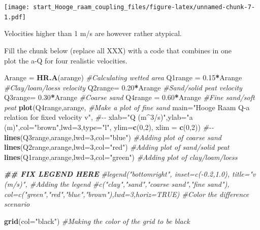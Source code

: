 \documentclass[
]{article}
\newenvironment{Shaded}{\begin{snugshade}}{\end{snugshade}}
\newcommand{\AttributeTok}[1]{\textcolor[rgb]{0.13,0.29,0.53}{#1}}
\newcommand{\CommentTok}[1]{\textcolor[rgb]{0.56,0.35,0.01}{\textit{#1}}}
\newcommand{\DecValTok}[1]{\textcolor[rgb]{0.00,0.00,0.81}{#1}}
\newcommand{\DocumentationTok}[1]{\textcolor[rgb]{0.56,0.35,0.01}{\textbf{\textit{#1}}}}
\newcommand{\FloatTok}[1]{\textcolor[rgb]{0.00,0.00,0.81}{#1}}
\newcommand{\FunctionTok}[1]{\textcolor[rgb]{0.13,0.29,0.53}{\textbf{#1}}}
\newcommand{\NormalTok}[1]{#1}
\newcommand{\OtherTok}[1]{\textcolor[rgb]{0.56,0.35,0.01}{#1}}
\newcommand{\SpecialCharTok}[1]{\textcolor[rgb]{0.81,0.36,0.00}{\textbf{#1}}}
\newcommand{\StringTok}[1]{\textcolor[rgb]{0.31,0.60,0.02}{#1}}
\begin{document}
\texttt{[image: start\_Hooge\_raam\_coupling\_files/figure-latex/unnamed-chunk-7-1.pdf]}

Velocities higher than 1 m/s are however rather atypical.

Fill the chunk below (replace all XXX) with a code that combines in
one\\
plot the a-Q for four realistic velocities.

\begin{Shaded}
\begin{Highlighting}[]
\NormalTok{Arange }\OtherTok{=}  \FunctionTok{HR.A}\NormalTok{(arange) }\CommentTok{\#Calculating wetted area}
\NormalTok{Q1range }\OtherTok{=} \FloatTok{0.15}\SpecialCharTok{*}\NormalTok{Arange  }\CommentTok{\#Clay/loam/loess velocity}
\NormalTok{Q2range}\OtherTok{=}  \FloatTok{0.20}\SpecialCharTok{*}\NormalTok{Arange   }\CommentTok{\#Sand/solid peat velocity}
\NormalTok{Q3range}\OtherTok{=}  \FloatTok{0.30}\SpecialCharTok{*}\NormalTok{Arange  }\CommentTok{\#Coarse sand }
\NormalTok{Q4range }\OtherTok{=} \FloatTok{0.60}\SpecialCharTok{*}\NormalTok{Arange     }\CommentTok{\#Fine sand/soft peat}
\FunctionTok{plot}\NormalTok{(Q4range,arange,   }\CommentTok{\#Make a plot of fine sand}
     \AttributeTok{main=}\StringTok{"Hooge Raam Q{-}a relation for fixed velocity v"}\NormalTok{, }\CommentTok{\#{-}{-}}
     \AttributeTok{xlab=}\StringTok{"Q (m\^{}3/s)"}\NormalTok{,}\AttributeTok{ylab=}\StringTok{"a (m)"}\NormalTok{,}\AttributeTok{col=}\StringTok{"brown"}\NormalTok{,}\AttributeTok{lwd=}\DecValTok{3}\NormalTok{,}\AttributeTok{type=}\StringTok{"l"}\NormalTok{, }\AttributeTok{ylim=}\FunctionTok{c}\NormalTok{(}\DecValTok{0}\NormalTok{,}\DecValTok{2}\NormalTok{), }\AttributeTok{xlim =} \FunctionTok{c}\NormalTok{(}\DecValTok{0}\NormalTok{,}\DecValTok{2}\NormalTok{)) }\CommentTok{\#{-}{-}}
\FunctionTok{lines}\NormalTok{(Q3range,arange,}\AttributeTok{lwd=}\DecValTok{3}\NormalTok{,}\AttributeTok{col=}\StringTok{"blue"}\NormalTok{) }\CommentTok{\#Adding plot of coarse sand}
\FunctionTok{lines}\NormalTok{(Q2range,arange,}\AttributeTok{lwd=}\DecValTok{3}\NormalTok{,}\AttributeTok{col=}\StringTok{"red"}\NormalTok{)  }\CommentTok{\#Adding plot of sand/solid peat}
\FunctionTok{lines}\NormalTok{(Q1range,arange,}\AttributeTok{lwd=}\DecValTok{3}\NormalTok{,}\AttributeTok{col=}\StringTok{"green"}\NormalTok{) }\CommentTok{\#Adding plot of clay/loam/loess}

\DocumentationTok{\#\# FIX LEGEND HERE}
\CommentTok{\#legend("bottomright", inset=c({-}0.2,1.0), title="v (m/s)", \#Adding the legend}
\CommentTok{\#c("clay","sand","coarse sand","fine sand"), col=c("green","red","blue","brown"),lwd=3,horiz=TRUE) \#Color the difference scenario}

\FunctionTok{grid}\NormalTok{(}\AttributeTok{col=}\StringTok{"black"}\NormalTok{) }\CommentTok{\#Making the color of the grid to be black}
\end{Highlighting}
\end{Shaded}
\end{document}
